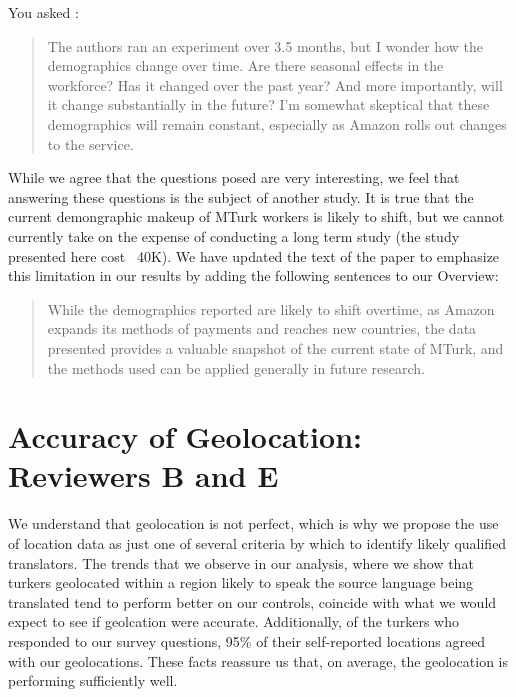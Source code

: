\documentclass[11pt]{article}
\begin{document}
You asked : 
\begin{quote}
The authors ran an experiment over 3.5 months, but I wonder how the demographics change over time. Are there seasonal effects in the workforce? Has it changed over the past year? And more importantly, will it change substantially in the future? I'm somewhat skeptical that these demographics will remain constant, especially as Amazon rolls out changes to the service.
\end{quote}

While we agree that the questions posed are very interesting, we feel that answering these questions is the subject of another study. It is true that the current demongraphic makeup of MTurk workers is likely to shift, but we cannot currently take on the expense of conducting a long term study (the study presented here cost ~40K). We have updated the text of the paper to emphasize this limitation in our results by adding the following sentences to our Overview: 
\begin{quote}
While the demographics reported are likely to shift overtime, as Amazon expands its methods of payments and reaches new countries, the data presented provides a 
valuable snapshot of the current state of MTurk, and the methods used can be applied generally in future research.
\end{quote}

\section{Accuracy of Geolocation: Reviewers B and E}

We understand that geolocation is not perfect, which is why we propose the use of location data as just one of several criteria by which to identify likely qualified translators. The trends that we observe in our analysis, where we show that turkers geolocated within a region likely to speak the source language being translated tend to perform better on our controls, coincide with what we would expect to see if geolcation were accurate. Additionally, of the turkers who responded to our survey questions, 95\% of their self-reported locations agreed with our geolocations. These facts reassure us that, on average, the geolocation is performing sufficiently well.
\end{document}
